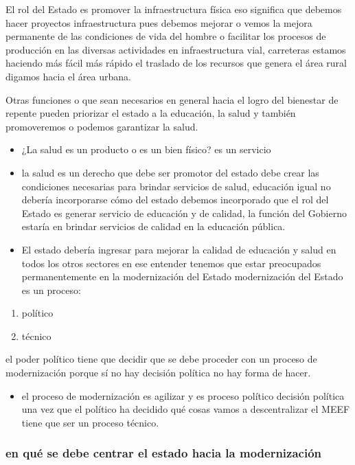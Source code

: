 \documentclass[
  a4paper,
]{article}
\providecommand{\tightlist}{%
  \setlength{\itemsep}{0pt}\setlength{\parskip}{0pt}}\usepackage{longtable,booktabs,array}
\begin{document}
El rol del Estado es promover la infraestructura física eso significa
que debemos hacer proyectos infraestructura pues debemos mejorar o vemos
la mejora permanente de las condiciones de vida del hombre o facilitar
los procesos de producción en las diversas actividades en
infraestructura vial, carreteras estamos haciendo más fácil más rápido
el traslado de los recursos que genera el área rural digamos hacia el
área urbana.

Otras funciones o que sean necesarios en general hacia el logro del
bienestar de repente pueden priorizar el estado a la educación, la salud
y también promoveremos o podemos garantizar la salud.

\begin{itemize}
\tightlist
\item
  ¿La salud es un producto o es un bien físico? es un servicio
\item
  la salud es un derecho que debe ser promotor del estado debe crear las
  condiciones necesarias para brindar servicios de salud, educación
  igual no debería incorporarse cómo del estado debemos incorporado que
  el rol del Estado es generar servicio de educación y de calidad, la
  función del Gobierno estaría en brindar servicios de calidad en la
  educación pública.
\item
  El estado debería ingresar para mejorar la calidad de educación y
  salud en todos los otros sectores en ese entender tenemos que estar
  preocupados permanentemente en la modernización del Estado
  modernización del Estado es un proceso:
\end{itemize}

\begin{enumerate}
\def\labelenumi{\arabic{enumi}.}
\tightlist
\item
  político
\item
  técnico
\end{enumerate}

el poder político tiene que decidir que se debe proceder con un proceso
de modernización porque sí no hay decisión política no hay forma de
hacer.

\begin{itemize}
\tightlist
\item
  el proceso de modernización es agilizar y es proceso político decisión
  política una vez que el político ha decidido qué cosas vamos a
  descentralizar el MEEF tiene que ser un proceso técnico.
\end{itemize}

\hypertarget{en-quuxe9-se-debe-centrar-el-estado-hacia-la-modernizaciuxf3n}{%
\subsubsection{en qué se debe centrar el estado hacia la
modernización}\label{en-quuxe9-se-debe-centrar-el-estado-hacia-la-modernizaciuxf3n}}
\end{document}
